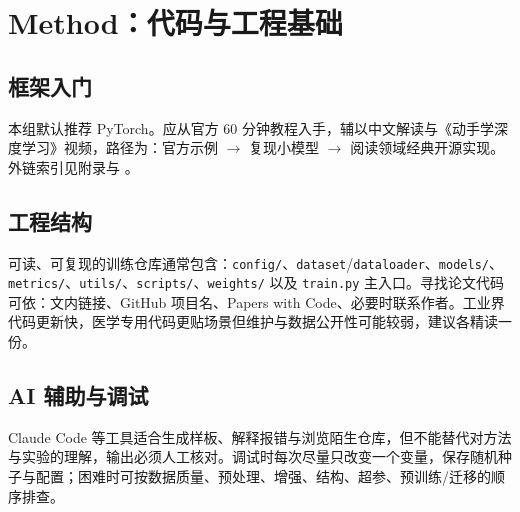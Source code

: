 ﻿\section{Method：代码与工程基础}
\label{sec:method}


\subsection{框架入门}
本组默认推荐 PyTorch。应从官方 60 分钟教程入手，辅以中文解读与《动手学深度学习》视频，路径为：官方示例 $\rightarrow$ 复现小模型 $\rightarrow$ 阅读领域经典开源实现。外链索引见附录与 。

\subsection{工程结构}
可读、可复现的训练仓库通常包含：\texttt{config/}、\texttt{dataset}/\texttt{dataloader}、\texttt{models/}、\texttt{metrics/}、\texttt{utils/}、\texttt{scripts/}、\texttt{weights/} 以及 \texttt{train.py} 主入口。寻找论文代码可依：文内链接、GitHub 项目名、Papers with Code、必要时联系作者。工业界代码更新快，医学专用代码更贴场景但维护与数据公开性可能较弱，建议各精读一份。

\subsection{AI 辅助与调试}
Claude Code 等工具适合生成样板、解释报错与浏览陌生仓库，但不能替代对方法与实验的理解，输出必须人工核对。调试时每次尽量只改变一个变量，保存随机种子与配置；困难时可按数据质量、预处理、增强、结构、超参、预训练/迁移的顺序排查。
